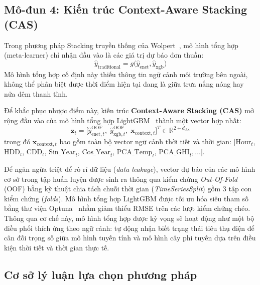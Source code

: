 \subsection{Mô-đun 4: Kiến trúc Context-Aware Stacking (CAS)}
\label{subsec:module4}

Trong phương pháp Stacking truyền thống của Wolpert~\cite{wolpert1992stacked}, mô hình tổng hợp (meta-learner) chỉ nhận đầu vào là các giá trị dự báo đơn thuần:
\begin{equation}
    \hat{y}_{\text{traditional}} = g\big(\hat{y}_{\text{enet}}, \hat{y}_{\text{xgb}}\big)
\end{equation}
Mô hình tổng hợp cố định này thiếu thông tin ngữ cảnh môi trường bên ngoài, không thể phân biệt được thời điểm hiện tại đang là giữa trưa nắng nóng hay nửa đêm thanh tĩnh.

Để khắc phục nhược điểm này, kiến trúc \textbf{Context-Aware Stacking (CAS)} mở rộng đầu vào của mô hình tổng hợp LightGBM~\cite{ke2017lightgbm} thành một vector hợp nhất:
\begin{equation}
    \mathbf{z}_t = \Big[ \hat{y}_{\text{enet}, t}^{\text{OOF}}, \; \hat{y}_{\text{xgb}, t}^{\text{OOF}}, \; \mathbf{x}_{\text{context}, t} \Big]^T \in \mathbb{R}^{2 + d_{\text{ctx}}}
\end{equation}
trong đó $\mathbf{x}_{\text{context}, t}$ bao gồm toàn bộ vector ngữ cảnh thời tiết và thời gian: $[\text{Hour}_t$, $\text{HDD}_t$, $\text{CDD}_t$, $\text{Sin\_Year}_t$, $\text{Cos\_Year}_t$, $\text{PCA\_Temp}_t$, $\text{PCA\_GHI}_t, \dots]$.

Để ngăn ngừa triệt để rò rỉ dữ liệu (\textit{data leakage}), vector dự báo của các mô hình cơ sở trong tập huấn luyện được sinh ra thông qua kiểm chứng \textit{Out-Of-Fold} (OOF) bằng kỹ thuật chia tách chuỗi thời gian (\textit{TimeSeriesSplit}) gồm 3 tập con kiểm chứng (\textit{folds}). Mô hình tổng hợp LightGBM được tối ưu hóa siêu tham số bằng thư viện Optuna~\cite{akiba2019optuna} nhằm giảm thiểu RMSE trên các lượt kiểm chứng chéo. Thông qua cơ chế này, mô hình tổng hợp được kỳ vọng sẽ hoạt động như một bộ điều phối thích ứng theo ngữ cảnh: tự động nhận biết trạng thái tiêu thụ điện để cân đối trọng số giữa mô hình tuyến tính và mô hình cây phi tuyến dựa trên điều kiện thời tiết và thời gian thực tế.

\subsection{Cơ sở lý luận lựa chọn phương pháp}
\label{subsec:rationale}

